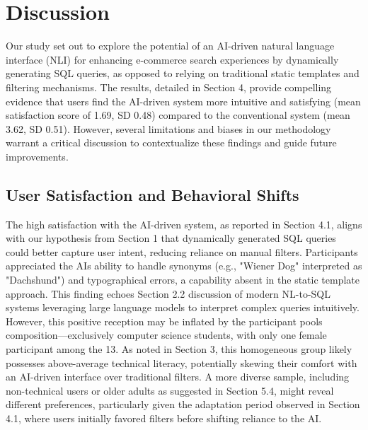 \documentclass[../../submission.tex]{subfiles}
\begin{document}
\section{Discussion}
Our study set out to explore the potential of an AI-driven natural language interface (NLI) 
for enhancing e-commerce search experiences by dynamically generating SQL queries, as opposed 
to relying on traditional static templates and filtering mechanisms. The results, detailed in 
Section 4, provide compelling evidence that users find the AI-driven system more intuitive and 
satisfying (mean satisfaction score of 1.69, SD 0.48) compared to the conventional system (mean 3.62, SD 0.51). 
However, several limitations and biases in our methodology warrant a critical discussion to contextualize these 
findings and guide future improvements.

\subsection{User Satisfaction and Behavioral Shifts}
The high satisfaction with the AI-driven system, as reported in Section 4.1, aligns 
with our hypothesis from Section 1 that dynamically generated SQL queries could better 
capture user intent, reducing reliance on manual filters. Participants appreciated the AIs ability 
to handle synonyms (e.g., "Wiener Dog" interpreted as "Dachshund") and typographical errors, a capability 
absent in the static template approach. This finding echoes Section 2.2 discussion of modern NL-to-SQL systems 
leveraging large language models to interpret complex queries intuitively. However, this positive reception may be inflated by 
the participant pools composition—exclusively computer science students, with only one female participant 
among the 13. As noted in Section 3, this homogeneous group likely possesses above-average technical literacy, 
potentially skewing their comfort with an AI-driven interface over traditional filters. A more diverse sample, 
including non-technical users or older adults as suggested in Section 5.4, might reveal different preferences, 
particularly given the adaptation period observed in Section 4.1, where users initially favored filters before shifting reliance to the AI.
\end{document}
